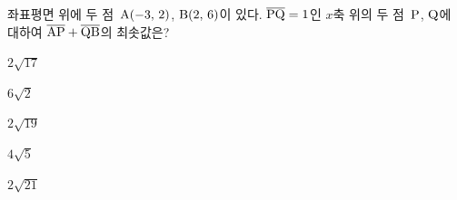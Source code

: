 좌표평면 위에 두 점~$\mathrm{A}(-3,\mkern3mu 2)$, $\mathrm{B}(2,\mkern3mu 6)$이 있다. $\overline{\mathrm{PQ}}=1$인 $x$축 위의 두 점~$\mathrm{P}$, $\mathrm{Q}$에 대하여 $\overline{\mathrm{AP}}+\overline{\mathrm{QB}}$의 최솟값은? 
\begin{choices32}{\rule[-3ex]{0pt}{8ex}$2\sqrt{17}$}{\rule[-3ex]{0pt}{8ex}$6\sqrt{2}$}{\rule[-3ex]{0pt}{8ex}$2\sqrt{19}$}{\rule[-3ex]{0pt}{8ex}$4\sqrt{5}$}{\rule[-3ex]{0pt}{8ex}$2\sqrt{21}$}\end{choices32}
